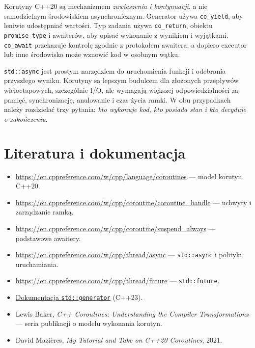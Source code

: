 Korutyny C++20 są mechanizmem \emph{zawieszenia i kontynuacji},
a nie samodzielnym środowiskiem asynchronicznym. Generator używa
\texttt{co\_yield}, aby leniwie udostępniać wartości. Typ zadania
używa \texttt{co\_return}, obiektu \texttt{promise\_type} i awaiterów,
aby opisać wykonanie z wynikiem i wyjątkami. \texttt{co\_await}
przekazuje kontrolę zgodnie z protokołem awaitera, a dopiero executor
lub inne środowisko może wznowić kod w osobnym wątku.

\texttt{std::async} jest prostym narzędziem do uruchomienia funkcji
i odebrania przyszłego wyniku. Korutyny są lepszym budulcem dla
złożonych przepływów wieloetapowych, szczególnie I/O, ale wymagają
większej odpowiedzialności za pamięć, synchronizację, anulowanie
i czas życia ramki. W obu przypadkach należy rozdzielać trzy pytania:
\emph{kto wykonuje kod, kto posiada stan i kto decyduje o zakończeniu}.

\section*{Literatura i dokumentacja}
\begin{itemize}
\item \url{https://en.cppreference.com/w/cpp/language/coroutines} --- model korutyn C++20.
\item \url{https://en.cppreference.com/w/cpp/coroutine/coroutine_handle} --- uchwyty i zarządzanie ramką.
\item \url{https://en.cppreference.com/w/cpp/coroutine/suspend_always} --- podstawowe awaitery.
\item \url{https://en.cppreference.com/w/cpp/thread/async} --- \texttt{std::async} i polityki uruchamiania.
\item \url{https://en.cppreference.com/w/cpp/thread/future} --- \texttt{std::future}.
\item \href{https://en.cppreference.com/w/cpp/coroutine/generator}{Dokumentacja \texttt{std::generator}} (C++23).
\item Lewis Baker, \emph{C++ Coroutines: Understanding the Compiler Transformations}
      --- seria publikacji o modelu wykonania korutyn.
\item David Mazières, \emph{My Tutorial and Take on C++20 Coroutines}, 2021.
\end{itemize}
